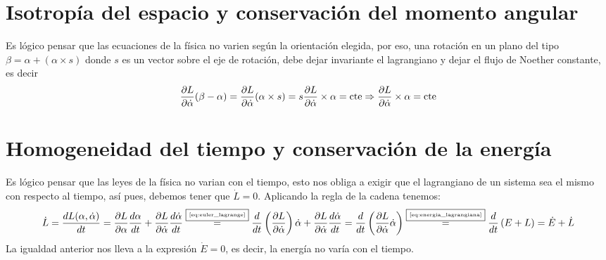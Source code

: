 \section{Isotropía del espacio y conservación del momento angular}
Es lógico pensar que las ecuaciones de la física no varien según la orientación elegida, por eso, una rotación en un plano del tipo $\beta=\alpha + (\alpha\times s)$ donde $s$ es un vector sobre el eje de rotación, debe dejar invariante el lagrangiano y dejar el flujo de Noether constante, es decir
\begin{equation}
    \label{eq:conservacion_momento_angular}
    \frac{\partial L}{\partial\dot{\alpha}}(\beta-\alpha) = \frac{\partial L}{\partial\dot{\alpha}}(\alpha\times s) = s \frac{\partial L}{\partial\dot{\alpha}}\times \alpha=\text{cte}\Rightarrow\frac{\partial L}{\partial\dot{\alpha}}\times \alpha=\text{cte}
\end{equation}


\section{Homogeneidad del tiempo y conservación de la energía}
Es lógico pensar que las leyes de la física no varian con el tiempo, esto nos obliga a exigir que el lagrangiano de un sistema sea el mismo con respecto al tiempo, así pues, debemos tener que $\dot{L}=0$.
Aplicando la regla de la cadena tenemos:
\begin{equation*}
    \dot{L}=\frac{dL(\alpha, \dot{\alpha})}{dt}=\frac{\partial L}{\partial \alpha}\frac{d\alpha}{dt}+\frac{\partial L}{\partial \dot{\alpha}}\frac{d\dot{\alpha}}{dt}\overset{\fbox{\tiny \ref{eq:euler_lagrange}}}{=}\frac{d}{dt}\left(\frac{\partial L}{\partial \dot{\alpha}}\right)\dot{\alpha}+\frac{\partial L}{\partial \dot{\alpha}}\frac{d\dot{\alpha}}{dt}=\frac{d}{dt}\left(\frac{\partial L}{\partial \dot{\alpha}}\dot{\alpha}\right)\overset{\fbox{\tiny \ref{eq:energia_lagrangiana}}}{=}\frac{d}{dt}\left(E+L\right)=\dot{E}+\dot{L}
\end{equation*}
La igualdad anterior nos lleva a la expresión $\dot{E}=0$, es decir, la energía no varía con el tiempo.
